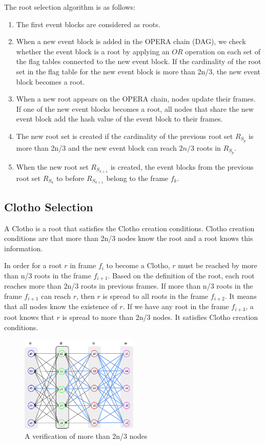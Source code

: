 \documentclass{article}
\begin{document}
The root selection algorithm is as follows:

\begin{enumerate}
\item The first event blocks are considered as roots. 
\item When a new event block is added in the OPERA chain (DAG), we check whether the event block is a root by applying an $OR$ operation on each set of the flag tables connected to the new event block. If the cardinality of the root set in the flag table for the new event block is more than 2n/3, the new event block becomes a root. 
\item When a new root appears on the OPERA chain, nodes update their frames. If one of the new event blocks becomes a root, all nodes that share the new event block add the hash value of the event block to their frames.  
\item The new root set is created if the cardinality of the previous root set $R_{S_p}$ is more than 2n/3 and the new event block can reach $2n/3$ roots in $R_{S_p}$.
\item When the new root set $R_{S_{k+1}}$ is created, the event blocks from the previous root set $R_{S_k}$ to before $R_{S_{k+1}}$ belong to the frame $f_k$.
\end{enumerate}



\subsection{Clotho Selection}

A Clotho is a root that satisfies the Clotho creation conditions. 
Clotho creation conditions are that more than 2n/3 nodes know the root and a root knows this information.

In order for a root $r$ in frame $f_i$ to become a Clotho, $r$ must be reached by more than n/3 roots in the frame $f_{i+1}$. Based on the definition of the root, each root reaches more than 2n/3 roots in previous frames. If more than n/3 roots in the frame $f_{i+1}$ can reach $r$, then $r$ is spread to all roots in the frame $f_{i+2}$. It means that all nodes know the existence of $r$. If we have any root in the frame $f_{i+3}$, a root knows that $r$ is spread to more than 2n/3 nodes. It satisfies Clotho creation conditions. 

\begin{figure} [h] \centering  
	\includegraphics[width=0.5\textwidth]{frame4.pdf}
	\caption{A verification of more than 2n/3 nodes}
	\label{fig:frame4}
\end{figure}
\end{document}
